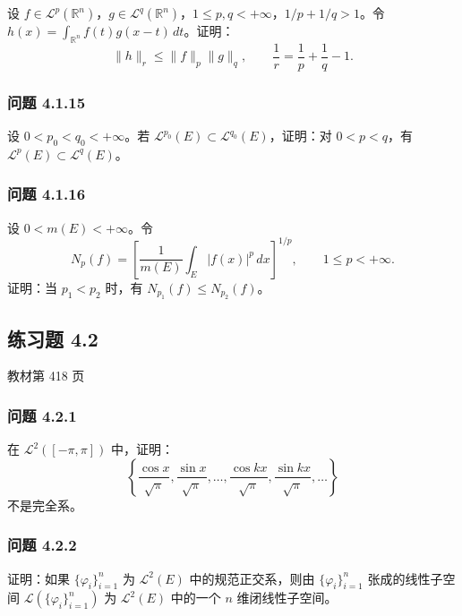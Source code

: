 \documentclass[11pt,a4paper]{article}
\begin{document}
设
\(f\in\mathcal L^p(\mathbb R^n)\)，\(g\in\mathcal L^q(\mathbb R^n)\)，\(1\le p,q<+\infty\)，\(1/p+1/q>1\)。令
\(h(x)=\int_{\mathbb R^n}f(t)g(x-t)\,dt\)。证明： \[
\|h\|_r\le\|f\|_p\|g\|_q,\qquad\frac1r=\frac1p+\frac1q-1.
\]

\subsubsection{问题 4.1.15}\label{ch04-practice-ux95eeux9898-4.1.15}

设 \(0<p_0<q_0<+\infty\)。若
\(\mathcal L^{p_0}(E)\subset\mathcal L^{q_0}(E)\)，证明：对
\(0<p<q\)，有 \(\mathcal L^p(E)\subset\mathcal L^q(E)\)。

\subsubsection{问题 4.1.16}\label{ch04-practice-ux95eeux9898-4.1.16}

设 \(0<m(E)<+\infty\)。令 \[
N_p(f)=\left[\frac1{m(E)}\int_E|f(x)|^p\,dx\right]^{1/p},\qquad1\le p<+\infty.
\] 证明：当 \(p_1<p_2\) 时，有 \(N_{p_1}(f)\le N_{p_2}(f)\)。

\subsection{练习题 4.2}\label{ch04-practice-ux7ec3ux4e60ux9898-4.2}

教材第 418 页

\subsubsection{问题 4.2.1}\label{ch04-practice-ux95eeux9898-4.2.1}

在 \(\mathcal L^2([-\pi,\pi])\) 中，证明： \[
\left\{\frac{\cos x}{\sqrt\pi},\frac{\sin x}{\sqrt\pi},\ldots,
\frac{\cos kx}{\sqrt\pi},\frac{\sin kx}{\sqrt\pi},\ldots\right\}
\] 不是完全系。

\subsubsection{问题 4.2.2}\label{ch04-practice-ux95eeux9898-4.2.2}

证明：如果 \(\{\varphi_i\}_{i=1}^n\) 为 \(\mathcal L^2(E)\)
中的规范正交系，则由 \(\{\varphi_i\}_{i=1}^n\) 张成的线性子空间
\(\mathcal L(\{\varphi_i\}_{i=1}^n)\) 为 \(\mathcal L^2(E)\) 中的一个
\(n\) 维闭线性子空间。
\end{document}
